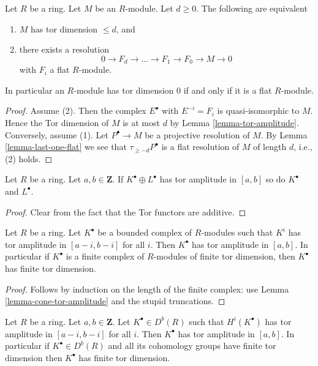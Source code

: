 \begin{lemma}
\label{lemma-tor-dimension}
Let $R$ be a ring. Let $M$ be an $R$-module.
Let $d \geq 0$. The following are equivalent
\begin{enumerate}
\item $M$ has tor dimension $\leq d$, and
\item there exists a resolution
$$
0 \to F_d \to \ldots \to F_1 \to F_0 \to M \to 0
$$
with $F_i$ a flat $R$-module.
\end{enumerate}
In particular an $R$-module has tor dimension $0$ if and only if
it is a flat $R$-module.
\end{lemma}

\begin{proof}
Assume (2). Then the complex $E^\bullet$ with $E^{-i} = F_i$
is quasi-isomorphic to $M$. Hence the Tor dimension of $M$ is
at most $d$ by
Lemma \ref{lemma-tor-amplitude}.
Conversely, assume (1). Let $P^\bullet \to M$ be a projective
resolution of $M$. By
Lemma \ref{lemma-last-one-flat}
we see that $\tau_{\geq -d}P^\bullet$ is a flat resolution of
$M$ of length $d$, i.e., (2) holds.
\end{proof}

\begin{lemma}
\label{lemma-summands-tor-amplitude}
Let $R$ be a ring. Let $a, b \in \mathbf{Z}$.
If $K^\bullet \oplus L^\bullet$ has tor amplitude in $[a, b]$
so do $K^\bullet$ and $L^\bullet$.
\end{lemma}

\begin{proof}
Clear from the fact that the Tor functors are additive.
\end{proof}

\begin{lemma}
\label{lemma-complex-finite-tor-dimension-modules}
Let $R$ be a ring. Let $K^\bullet$ be a bounded complex of $R$-modules
such that $K^i$ has tor amplitude in $[a - i, b - i]$ for all $i$.
Then $K^\bullet$ has tor amplitude in $[a, b]$. In particular
if $K^\bullet$ is a finite complex of $R$-modules of finite tor dimension,
then $K^\bullet$ has finite tor dimension.
\end{lemma}

\begin{proof}
Follows by induction on the length of the finite complex: use
Lemma \ref{lemma-cone-tor-amplitude}
and the stupid truncations.
\end{proof}

\begin{lemma}
\label{lemma-cohomology-tor-amplitude}
Let $R$ be a ring. Let $a, b \in \mathbf{Z}$. Let $K^\bullet \in D^b(R)$
such that $H^i(K^\bullet)$ has tor amplitude in $[a - i, b - i]$
for all $i$. Then $K^\bullet$ has tor amplitude in $[a, b]$. In particular
if $K^\bullet \in D^b(R)$ and all its cohomology groups have finite tor
dimension then $K^\bullet$ has finite tor dimension.
\end{lemma}

